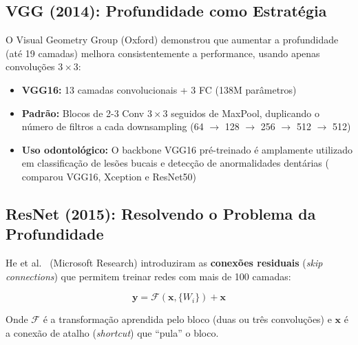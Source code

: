 \subsection{VGG (2014): Profundidade como Estratégia}

O Visual Geometry Group (Oxford) demonstrou que aumentar a profundidade (até 19
camadas) melhora consistentemente a performance, usando apenas convoluções $3\times3$:

\begin{itemize}
  \item \textbf{VGG16:} 13 camadas convolucionais + 3 FC (138M parâmetros)
  \item \textbf{Padrão:} Blocos de 2-3 Conv $3\times3$ seguidos de MaxPool,
        duplicando o número de filtros a cada downsampling (64 $\to$ 128 $\to$
        256 $\to$ 512 $\to$ 512)
  \item \textbf{Uso odontológico:} O backbone VGG16 pré-treinado é amplamente
        utilizado em classificação de lesões bucais e detecção de anormalidades
        dentárias ( comparou VGG16, Xception e ResNet50)
\end{itemize}

\subsection{ResNet (2015): Resolvendo o Problema da Profundidade}

He et al.~\cite{he2016deep} (Microsoft Research) introduziram as \textbf{conexões residuais}
(\textit{skip connections}) que permitem treinar redes com mais de 100 camadas:

\begin{equation}
  \mathbf{y} = \mathcal{F}(\mathbf{x}, \{W_i\}) + \mathbf{x}
  \label{eq:residual}
\end{equation}

Onde $\mathcal{F}$ é a transformação aprendida pelo bloco (duas ou três convoluções)
e $\mathbf{x}$ é a conexão de atalho (\textit{shortcut}) que ``pula'' o bloco.

